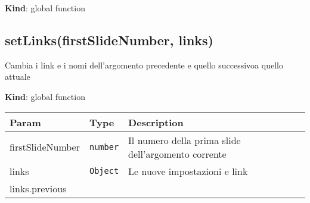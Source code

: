 \textbf{Kind}: global function\\
\protect\hypertarget{setLinks}{}{}

\hypertarget{setlinksfirstslidenumber-links}{%
\subsection{setLinks(firstSlideNumber,
links)}\label{setlinksfirstslidenumber-links}}

Cambia i link e i nomi dell'argomento precedente e quello successivoa
quello attuale

\textbf{Kind}: global function

\begin{tabularx}{\textwidth}{XXX}
\toprule
\begin{minipage}[b]{0.30\columnwidth}\raggedright
Param\strut
\end{minipage} & \begin{minipage}[b]{0.30\columnwidth}\raggedright
Type\strut
\end{minipage} & \begin{minipage}[b]{0.30\columnwidth}\raggedright
Description\strut
\end{minipage}\tabularnewline
\midrule
\endhead
\begin{minipage}[t]{0.30\columnwidth}\raggedright
firstSlideNumber\strut
\end{minipage} & \begin{minipage}[t]{0.30\columnwidth}\raggedright
\texttt{number}\strut
\end{minipage} & \begin{minipage}[t]{0.30\columnwidth}\raggedright
Il numero della prima slide dell'argomento corrente\strut
\end{minipage}\tabularnewline
\begin{minipage}[t]{0.30\columnwidth}\raggedright
links\strut
\end{minipage} & \begin{minipage}[t]{0.30\columnwidth}\raggedright
\texttt{Object}\strut
\end{minipage} & \begin{minipage}[t]{0.30\columnwidth}\raggedright
Le nuove impostazioni e link\strut
\end{minipage}\tabularnewline
\begin{minipage}[t]{0.30\columnwidth}\raggedright
links.previous\strut
\end{minipage} & \begin{minipage}[t]{0.30\columnwidth}\raggedright

\end{minipage}
\end{tabularx}

